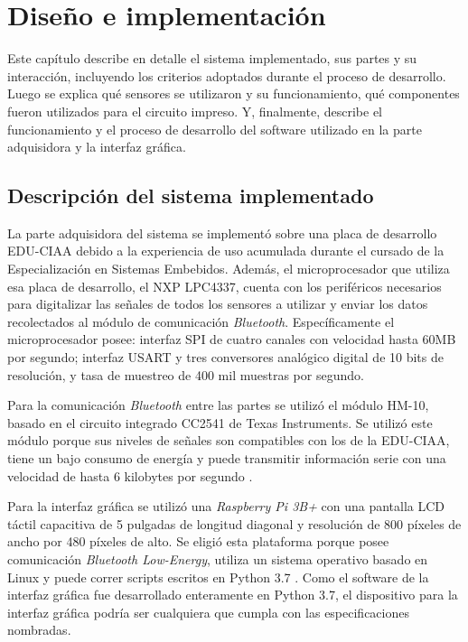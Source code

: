 \chapter{Diseño e implementación} %

\label{Chapter3}

Este capítulo describe en detalle el sistema implementado, sus partes y su interacción, incluyendo los criterios adoptados durante el proceso de desarrollo. Luego se explica qué sensores se utilizaron y su funcionamiento, qué componentes fueron utilizados para el circuito impreso. Y, finalmente, describe el funcionamiento y el proceso de desarrollo del software utilizado en la parte adquisidora y la interfaz gráfica.

\section{Descripción del sistema implementado}

La parte adquisidora del sistema se implementó sobre una placa de desarrollo EDU-CIAA debido a la experiencia de uso acumulada durante el cursado de la Especialización en Sistemas Embebidos. Además, el microprocesador que utiliza esa placa de desarrollo, el NXP LPC4337, cuenta con los periféricos necesarios para digitalizar las señales de todos los sensores a utilizar y enviar los datos recolectados al módulo de comunicación \textit{Bluetooth}. Específicamente el microprocesador posee: interfaz SPI de cuatro canales con velocidad hasta 60MB por segundo; interfaz USART y tres conversores analógico digital de 10 bits de resolución, y tasa de muestreo de 400 mil muestras por segundo.

Para la comunicación \textit{Bluetooth} entre las partes se utilizó el módulo HM-10, basado en el circuito integrado CC2541 de Texas Instruments. Se utilizó este módulo porque sus niveles de señales son compatibles con los de la EDU-CIAA, tiene un bajo consumo de energía y puede transmitir información serie con una velocidad de hasta 6 kilobytes por segundo \cite{HM-10}.

Para la interfaz gráfica se utilizó una \textit{Raspberry Pi 3B+} con una pantalla LCD táctil capacitiva de 5 pulgadas de longitud diagonal y resolución de 800 píxeles de ancho por 480 píxeles de alto. Se eligió esta plataforma porque posee comunicación \textit{Bluetooth Low-Energy}, utiliza un sistema operativo basado en Linux y puede correr scripts escritos en Python 3.7 \cite{raspberrypi}. Como el software de la interfaz gráfica fue desarrollado enteramente en Python 3.7, el dispositivo para la interfaz gráfica podría ser cualquiera que cumpla con las especificaciones nombradas.

